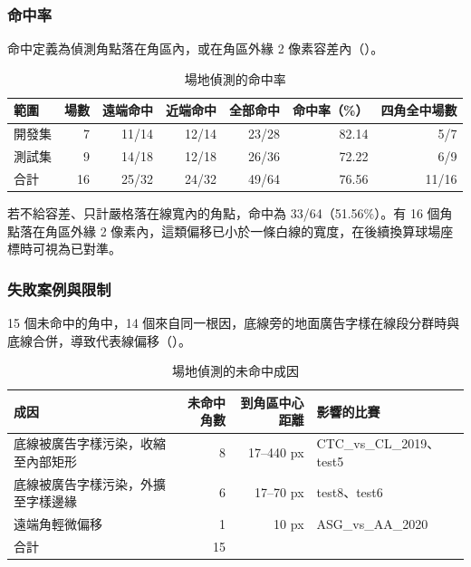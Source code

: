\subsubsection{命中率}

命中定義為偵測角點落在角區內，或在角區外緣 2 像素容差內（）。

\begin{table}[htbp]
  \centering
  \small
  \caption{場地偵測的命中率}
  \label{tab:court-hit}
  \begin{tabular}{|l|r|r|r|r|r|r|}
    \hline
    範圍 & 場數 & 遠端命中 & 近端命中 & 全部命中 & 命中率（\%） & 四角全中場數 \\ \hline
    開發集 & 7 & 11/14 & 12/14 & 23/28 & 82.14 & 5/7 \\ \hline
    測試集 & 9 & 14/18 & 12/18 & 26/36 & 72.22 & 6/9 \\ \hline
    合計 & 16 & 25/32 & 24/32 & 49/64 & 76.56 & 11/16 \\ \hline
  \end{tabular}
\end{table}

若不給容差、只計嚴格落在線寬內的角點，命中為 33/64（51.56\%）。有 16 個角點落在角區外緣 2 像素內，這類偏移已小於一條白線的寬度，在後續換算球場座標時可視為已對準。

\subsubsection{失敗案例與限制}

15 個未命中的角中，14 個來自同一根因，底線旁的地面廣告字樣在線段分群時與底線合併，導致代表線偏移（）。

\begin{table}[htbp]
  \centering
  \small
  \caption{場地偵測的未命中成因}
  \label{tab:court-failures}
  \begin{tabularx}{\linewidth}{|L|r|r|l|}
    \hline
    成因 & 未命中角數 & 到角區中心距離 & 影響的比賽 \\ \hline
    底線被廣告字樣污染，收縮至內部矩形 & 8 & 17--440 px & CTC\_vs\_CL\_2019、test5 \\ \hline
    底線被廣告字樣污染，外擴至字樣邊緣 & 6 & 17--70 px & test8、test6 \\ \hline
    遠端角輕微偏移 & 1 & 10 px & ASG\_vs\_AA\_2020 \\ \hline
    合計 & 15 & & \\ \hline
  \end{tabularx}
\end{table}

